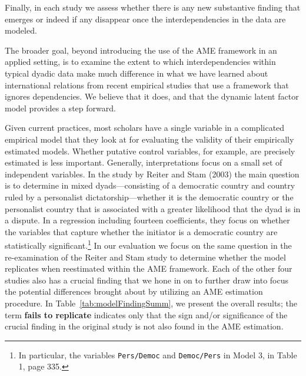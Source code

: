 Finally, in each study we assess whether there is any new substantive finding that emerges or indeed if any disappear once the interdependencies in the data are modeled.

The broader goal, beyond introducing the use of the AME framework in an applied setting, is to examine the extent to which interdependencies within typical dyadic data make much difference in what we have learned about international relations from recent empirical studies that use a framework that ignores dependencies.  We believe that it does, and that the dynamic latent factor model provides a step forward.

Given current practices, most scholars have a single variable in a complicated empirical model that they look at for evaluating the validity of their empirically estimated models.  Whether putative control variables, for example, are precisely estimated is less important. Generally, interpretations focus on a small set of independent variables.  In the study by Reiter and Stam (2003) the main question is to determine in mixed dyads---consisting of a democratic country and country ruled by a personalist dictatorship---whether it is the
democratic country or the personalist country that is associated with a greater likelihood that the dyad is in a dispute.  In a regression including fourteen coefficients, they focus on whether the variables that capture whether the initiator is a democratic country are statistically significant.\footnote{In particular, the variables \texttt{Pers/Democ} and \texttt{Democ/Pers} in Model 3, in Table 1, page 335.} In our evaluation we focus on the same question in the re-examination of the Reiter and Stam study to determine whether the model replicates when reestimated within the AME framework. Each of the other four studies also has a crucial finding that we hone in on to further draw into focus the potential differences brought about by utilizing an AME estimation procedure.  In Table~\ref{tab:modelFindingSumm}, we present the overall results; the term \textbf{fails to replicate} indicates only that the sign and/or significance of the crucial finding in the original study is not also found in the AME estimation.
 

